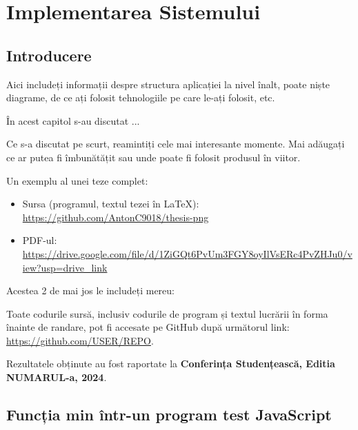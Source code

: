 \documentclass[a4paper,12pt]{report}
\renewcommand{\year}{2024}
\newcommand{\conferencesList}{Conferința Studențească, Editia NUMARUL-a, \year}
\newcommand{\github}{\url{https://github.com/USER/REPO}}
\begin{document}

\chapter{Implementarea Sistemului}\label{implementation_chapter_title}

\section{Introducere}

Aici includeți informații despre structura aplicației la nivel înalt, 
poate niște diagrame, de ce ați folosit tehnologiile pe care le-ați folosit, etc.


În acest capitol s-au discutat ...


Ce s-a discutat pe scurt, reamintiți cele mai interesante momente.
Mai adăugați ce ar putea fi îmbunătățit sau unde poate fi folosit produsul în viitor.

Un exemplu al unei teze complet:
\begin{itemize}
  \item Sursa (programul, textul tezei în \LaTeX{}): \url{https://github.com/AntonC9018/thesis-png}
  \item PDF-ul: \url{https://drive.google.com/file/d/1ZiGQt6PvUm3FGY8oyIlVsERc4PvZHJu0/view?usp=drive_link}
\end{itemize}

Acestea 2 de mai jos le includeți mereu:

Toate codurile sursă, inclusiv codurile de program și textul lucrării
în forma înainte de randare, pot fi accesate pe GitHub după următorul link: \github.

Rezultatele obținute au fost raportate la \textbf{\conferencesList}\cite{self}.

\bibliographyChapter

\appendixChapter

\section{Funcția min într-un program test JavaScript}\label{appendix:example_min}
\inputminted{js}{../src/appendix_example.js}

\declarationPage{}
\end{document}
